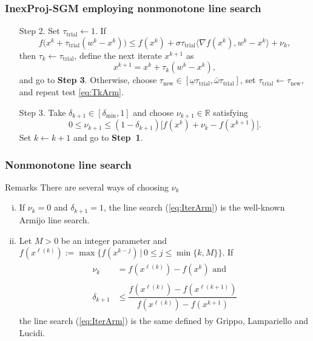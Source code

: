 \begingroup
\small
\begin{frame}[t]
  \frametitle{InexProj-SGM employing nonmonotone line search}

  \begin{enumerate}
    \item[Step 2.\footfullcite{BirginMartinezRaydan2003}] Set $\tau_{\textrm{trial}} \gets 1$. If
      \begin{equation}\label{eq:TkArm}
        f\Big(x^{k}+ \tau_{\textrm{trial}}(w^k - x^{k})\Big) \leq f(x^{k}) + \sigma \tau_{\textrm{trial}}\Big\langle \nabla f(x^{k}), w^k - x^{k} \Big\rangle + \nu_k,
      \end{equation}
      then  $\tau_k\gets \tau_{\textrm{trial}}$, define the next iterate $x^{k+1}$ as
      \begin{equation} \label{eq:IterArm}
        x^{k+1} = x^{k} + \tau_k (w^k - x^{k}),
      \end{equation}
      and go to {\bf Step 3}. Otherwise, choose $\tau_{\textrm{new}} \in [\underline\omega \tau_{\textrm{trial}}, \bar\omega \tau_{\textrm{trial}} ]$, set $\tau_{\textrm{trial}} \gets \tau_{\textrm{new}}$, and repeat test \eqref{eq:TkArm}.

    \item [Step 3.\footfullcite{GrapigliaSachs2017}] Take  $\delta_{k+1}\in [\delta_{\min}, 1]$ and choose    $\nu_{k+1}\in {\mathbb R}$ satisfying
          \begin{equation*}
            0\leq \nu_{k+1}\leq (1-\delta_{k+1})\Big[f(x^{k})+\nu_{k}-f(x^{k+1})\Big].
          \end{equation*}
          Set $k\gets k+1$ and go to \textbf{Step~1}.
  \end{enumerate}
\end{frame}
\endgroup

\begin{frame}[t]\frametitle{Nonmonotone line search}
  \begin{block}{Remarks}
    There are several ways of choosing $\nu_k$
    \begin{enumerate}[(i)]
      \item If $\nu_k = 0$ and $\delta_{k+1}=1$, the line search (\ref{eq:IterArm}) is the well-known Armijo line search.
      \item Let $M>0$ be an integer parameter and  $f(x^{\ell(k)}) := \max\{f(x^{k-j})\, | \, 0\leq j\leq \min\{k,M\}\}$. If
            \begin{align}\label{eq:nuGLL}
              \begin{aligned}
                \nu_k        & = f(x^{\ell(k)}) - f(x^k) \mbox{ and }                                    \\
                \\
                \delta_{k+1} & \leq  \dfrac{f(x^{\ell(k)})- f(x^{\ell(k+1)})}{f(x^{\ell(k)})-f(x^{k+1})}
              \end{aligned}
            \end{align}
            the line search (\ref{eq:IterArm}) is the same defined by Grippo, Lampariello and Lucidi.
    \end{enumerate}
  \end{block}
\end{frame}

